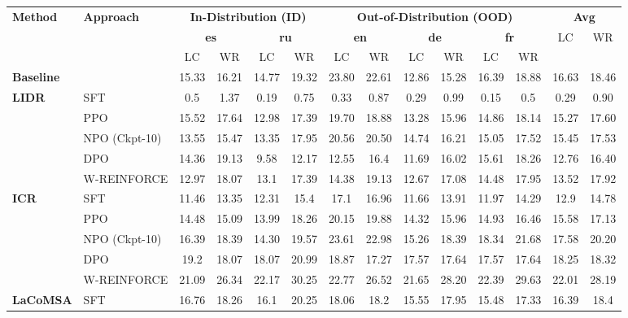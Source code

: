 \begin{table}[t]
\centering
\scriptsize
\setlength{\tabcolsep}{4pt}
\renewcommand{\arraystretch}{1.15}
\begin{tabular}{ll|cc|cc|cc|cc|cc|cc}
\toprule
\multirow{2}{*}{\textbf{Method}} & \multirow{2}{*}{\textbf{Approach}} & \multicolumn{4}{c|}{\textbf{In-Distribution (ID)}} & \multicolumn{6}{c|}{\textbf{Out-of-Distribution (OOD)}} & \multicolumn{2}{c}{\textbf{Avg}} \\
 &  & \multicolumn{2}{c}{\textbf{es}} & \multicolumn{2}{c|}{\textbf{ru}} & \multicolumn{2}{c}{\textbf{en}} & \multicolumn{2}{c}{\textbf{de}} & \multicolumn{2}{c|}{\textbf{fr}} & LC & WR \\
 &  & LC & WR & LC & WR & LC & WR & LC & WR & LC & WR &  &  \\
\midrule
\textbf{Baseline} &  & 15.33 & 16.21 & 14.77 & 19.32 & 23.80 & 22.61 & 12.86 & 15.28 & 16.39 & 18.88 & 16.63 & 18.46 \\
\midrule
\multirow{5}{*}{\textbf{LIDR}} & SFT & 0.5 & 1.37 & 0.19 & 0.75 & 0.33 & 0.87 & 0.29 & 0.99 & 0.15 & 0.5 & 0.29 & 0.90 \\
  & PPO & 15.52 & 17.64 & 12.98 & 17.39 & 19.70 & 18.88 & 13.28 & 15.96 & 14.86 & 18.14 & 15.27 & 17.60 \\
  & NPO (Ckpt-10) & 13.55 & 15.47 & 13.35 & 17.95 & 20.56 & 20.50 & 14.74 & 16.21 & 15.05 & 17.52 & 15.45 & 17.53 \\
  & DPO & 14.36 & 19.13 & 9.58 & 12.17 & 12.55 & 16.4 & 11.69 & 16.02 & 15.61 & 18.26 & 12.76 & 16.40 \\
  & W-REINFORCE & 12.97 & 18.07 & 13.1 & 17.39 & 14.38 & 19.13 & 12.67 & 17.08 & 14.48 & 17.95 & 13.52 & 17.92 \\
\midrule
\multirow{5}{*}{\textbf{ICR}} & SFT & 11.46 & 13.35 & 12.31 & 15.4 & 17.1 & 16.96 & 11.66 & 13.91 & 11.97 & 14.29 & 12.9 & 14.78 \\
  & PPO & 14.48 & 15.09 & 13.99 & 18.26 & 20.15 & 19.88 & 14.32 & 15.96 & 14.93 & 16.46 & 15.58 & 17.13 \\
  & NPO (Ckpt-10) & 16.39 & 18.39 & 14.30 & 19.57 & 23.61 & 22.98 & 15.26 & 18.39 & 18.34 & 21.68 & 17.58 & 20.20 \\
  & DPO & 19.2 & 18.07 & 18.07 & 20.99 & 18.87 & 17.27 & 17.57 & 17.64 & 17.57 & 17.64 & 18.25 & 18.32 \\
  & W-REINFORCE & 21.09 & 26.34 & 22.17 & 30.25 & 22.77 & 26.52 & 21.65 & 28.20 & 22.39 & 29.63 & 22.01 & 28.19 \\
\midrule
\multirow{5}{*}{\textbf{LaCoMSA}} & SFT & 16.76 & 18.26 & 16.1 & 20.25 & 18.06 & 18.2 & 15.55 & 17.95 & 15.48 & 17.33 & 16.39 & 18.4 \\

\end{tabular}
\end{table}
